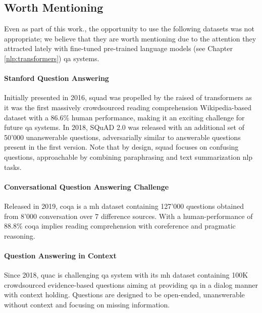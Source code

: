 \subsection{Worth Mentioning}
Even as part of this work., the opportunity to use the following datasets was not appropriate; we believe that they are worth mentioning due to the attention they attracted lately with fine-tuned pre-trained language models (see Chapter \ref{nlp:transformers}) \gls{qa} systems.

\paragraph{Stanford Question Answering}
\label{dataset:squad}
Initially presented in 2016, \gls{squad} \autocite{paper:journals/corr/RajpurkarZLL16} was propelled by the raised of \glspl{transformer} as it was the first massively crowdsourced reading comprehension Wikipedia-based dataset with a 86.6\% human performance, making it an exciting challenge for future \gls{qa} systems. In 2018, SQuAD 2.0 \autocite{paper:journals/corr/abs-1806-03822} was released with an additional set of 50'000 unanswerable questions, adversarially similar to answerable questions present in the first version. Note that by design, \gls{squad} focuses on confusing questions, approachable by combining paraphrasing and text summarization \gls{nlp} tasks.

\paragraph{Conversational Question Answering Challenge}
\label{dataset:coqa}
Released in 2019, \gls{coqa} \autocite{paper:journals/corr/abs-1808-07042} is a \gls{mh} dataset containing 127'000 questions obtained from 8'000 conversation over 7 difference sources. With a human-performance of 88.8\% \gls{coqa} implies reading comprehension with coreference and pragmatic reasoning.

\paragraph{Question Answering in Context}
Since 2018, \gls{quac} \autocite{paper:journals/corr/abs-1808-07036} is challenging \gls{qa} system with its \gls{mh} dataset containing 100K crowdsourced evidence-based questions aiming at providing \gls{qa} in a dialog manner with context holding. Questions are designed to be open-ended, unanswerable without context and focusing on missing information.

